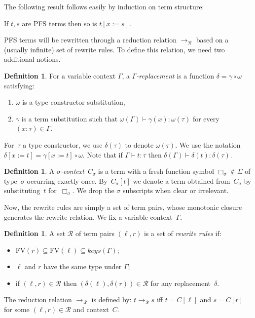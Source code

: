\documentclass[a4paper,UKenglish,cleveref,autoref,numberwithinsect]{lipics-v2019}
\theoremstyle{definition}
\newtheorem{defn}[theorem]{Definition}
\newcommand{\Rules}{\mathcal{R}}
\newcommand{\subst}[2]{#1:=#2}
\newcommand{\arr}[1]{\longrightarrow_{#1}}
\newcommand{\FV}{\mathrm{FV}}
\newcommand{\proves}{\vdash}
\begin{document}
The following result follows easily by induction on term
structure:

\begin{lemma}
  If $t,s$ are PFS terms then so is $t[\subst{x}{s}]$.
\end{lemma}

PFS terms will be rewritten through a reduction relation
$\arr{\Rules}$ based on a (usually infinite) set of rewrite rules. To
define this relation, we need two additional notions.

\begin{defn}\label{def_replacement}
  For a variable context $\Gamma$,
  a \emph{$\Gamma$-replacement} is a function $\delta = \gamma \circ
  \omega$ satisfying:
  \begin{enumerate}
  \item $\omega$ is a type constructor substitution,
  \item $\gamma$ is a term substitution such that $\omega(\Gamma)
    \proves \gamma(x) : \omega(\tau)$ for every $(x : \tau) \in
    \Gamma$.
  \end{enumerate}

  For~$\tau$ a type constructor, we use $\delta(\tau)$ to denote
  $\omega(\tau)$. We use the notation $\delta[\subst{x}{t}] =
  \gamma[\subst{x}{t}] \circ \omega$. Note that if $\Gamma \proves t :
  \tau$ then $\delta(\Gamma) \proves \delta(t) : \delta(\tau)$.
\end{defn}

\begin{defn}\label{def:context}
  A \emph{$\sigma$-context}~$C_\sigma$ is a term with a fresh function
  symbol $\Box_\sigma \notin \Sigma$ of type~$\sigma$ occurring
  exactly once. By~$C_\sigma[t]$ we denote a term obtained
  from~$C_\sigma$ by substituting~$t$ for~$\Box_\sigma$. We drop the
  $\sigma$ subscripts when clear or irrelevant.
\end{defn}

Now, the rewrite rules are simply a set of term pairs, whose
monotonic closure generates the rewrite relation. We fix a variable
context~$\Gamma$.

\begin{defn}\label{def_rules}
  A set $\Rules$ of term pairs $(\ell,r)$ is a set of \emph{rewrite
    rules} if:
  \begin{itemize}
  \item $\FV(r) \subseteq \FV(\ell) \subseteq \mathit{keys}(\Gamma)$;
  \item $\ell$ and $r$ have the same type under $\Gamma$;
  \item if $(\ell,r) \in \Rules$ then $(\delta(\ell),\delta(r)) \in
    \Rules$ for any replacement~$\delta$.
  \end{itemize}
  The reduction relation $\arr{\Rules}$ is defined by: $t \arr{\Rules}
  s$ iff $t = C[\ell]$ and $s = C[r]$ for some $(\ell,r)\in\Rules$ and
  context~$C$.
\end{defn}
\end{document}
